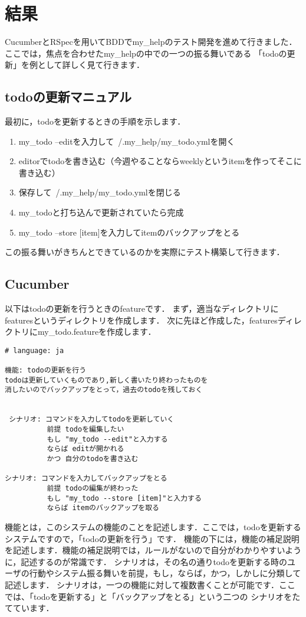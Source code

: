 
\section{結果}
CucumberとRSpecを用いてBDDでmy\_helpのテスト開発を進めて行きました．
ここでは，焦点を合わせたmy\_helpの中での一つの振る舞いである
「todoの更新」を例として詳しく見て行きます．

\subsection{todoの更新マニュアル}
最初に，todoを更新するときの手順を示します．

\begin{enumerate}
\item my\_todo --editを入力して~/.my\_help/my\_todo.ymlを開く
\item editorでtodoを書き込む（今週やることならweeklyというitemを作ってそこに書き込む）
\item 保存して~/.my\_help/my\_todo.ymlを閉じる
\item my\_todoと打ち込んで更新されていたら完成
\item my\_todo --store [item]を入力してitemのバックアップをとる
\end{enumerate}
この振る舞いがきちんとできているのかを実際にテスト構築して行きます．

\subsection{Cucumber}
以下はtodoの更新を行うときのfeatureです．
まず，適当なディレクトリにfeaturesというディレクトリを作成します．
次に先ほど作成した，featuresディレクトリにmy\_todo.featureを作成します．
\begin{lstlisting}[style=customCsh]
# language: ja 

機能: todoの更新を行う
todoは更新していくものであり,新しく書いたり終わったものを
消したいのでバックアップをとって，過去のtodoを残しておく


 シナリオ: コマンドを入力してtodoを更新していく
          前提 todoを編集したい
          もし "my_todo --edit"と入力する
          ならば editが開かれる
          かつ 自分のtodoを書き込む

シナリオ: コマンドを入力してバックアップをとる
          前提 todoの編集が終わった
          もし "my_todo --store [item]"と入力する
          ならば itemのバックアップを取る

\end{lstlisting}
機能とは，このシステムの機能のことを記述します．ここでは，todoを更新するシステムですので，「todoの更新を行う」です．
機能の下には，機能の補足説明を記述します．機能の補足説明では，ルールがないので自分がわかりやすいように，記述するのが常識です．
シナリオは，その名の通りtodoを更新する時のユーザの行動やシステム振る舞いを前提，もし，ならば，かつ，しかしに分類して記述します．
シナリオは，一つの機能に対して複数書くことが可能です．ここでは、「todoを更新する」と「バックアップをとる」という二つの
シナリオをたてています．


